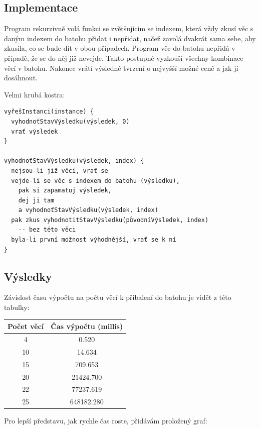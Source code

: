 \documentclass[12pt,a4paper]{article}
\begin{document}
\subsection{Implementace}

Program rekurzivně volá funkci se zvětšujícím se indexem, která vždy zkusí věc s daným indexem do batohu
přidat i nepřidat, načež zavolá dvakrát sama sebe, aby zkusila, co se bude dít v obou případech. Program věc do batohu
nepřidá v případě, že se do něj již nevejde. Takto postupně vyzkouší všechny kombinace věcí v batohu. Nakonec
vrátí výsledné tvrzení o nejvyšší možné ceně a jak jí dosáhnout.

Velmi hrubá kostra:

\begin{verbatim}
vyřešInstanci(instance) {
  vyhodnoťStavVýsledku(výsledek, 0)
  vrať výsledek
}

vyhodnoťStavVýsledku(výsledek, index) {
  nejsou-li již věci, vrať se
  vejde-li se věc s indexem do batohu (výsledku),
    pak si zapamatuj výsledek,
    dej ji tam 
    a vyhodnoťStavVýsledku(výsledek, index)
  pak zkus vyhodnotitStavVýsledku(původníVýsledek, index)
    -- bez této věci
  byla-li první možnost výhodnější, vrať se k ní
}
\end{verbatim}

\subsection{Výsledky}

Závislost času výpočtu na počtu věcí k přibalení do batohu je vidět z této tabulky:

\begin{center}
\begin{tabular}{|c|c|}
\hline
Počet věcí & Čas výpočtu (millis) \\
\hline\hline
4 & 0.520 \\
\hline
10 & 14.634 \\
\hline
15 & 709.653 \\
\hline
20 & 21424.700 \\
\hline
22 & 77237.619 \\
\hline
25 & 648182.280 \\
\hline
\end{tabular}
\end{center}

Pro lepší představu, jak rychle čas roste, přidávám proložený graf:
\end{document}
